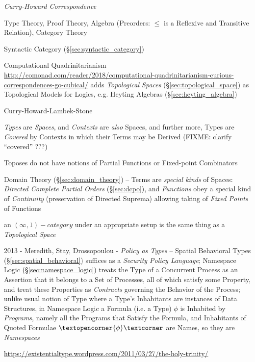 \emph{Curry-Howard Correspondence}

Type Theory, Proof Theory, Algebra (Preorders: $\leq$ is a Reflexive
and Transitive Relation), Category Theory

Syntactic Category (\S\ref{sec:syntactic_category}) %

Computational Quadrinitarianism
\url{http://comonad.com/reader/2018/computational-quadrinitarianism-curious-correspondences-go-cubical/}
adds \emph{Topological Spaces} (\S\ref{sec:topological_space}) as Topological
Models for Logics, e.g. Heyting Algebras (\S\ref{sec:heyting_algebra})

Curry-Howard-Lambek-Stone

\emph{Types} are \emph{Spaces}, and \emph{Contexts} are \emph{also} Spaces, and
further more, Types are \emph{Covered} by Contexts in which their Terms may be
Derived (FIXME: clarify ``covered'' ???)

Toposes do not have notions of Partial Functions or Fixed-point
Combinators

Domain Theory (\S\ref{sec:domain_theory}) -- Terms are \emph{special kinds} of
Spaces: \emph{Directed Complete Partial Orders} (\S\ref{sec:dcpo}), and
\emph{Functions} obey a special kind of \emph{Continuity} (preservation of
Directed Suprema) allowing taking of \emph{Fixed Points} of Functions

an $(\infty,1)-category$ under an appropriate setup is the same thing as a
\emph{Topological Space}

2013 - Meredith, Stay, Drossopoulou - \emph{Policy as Types} -- Spatial
Behavioral Types (\S\ref{sec:spatial_behavioral}) suffices as a \emph{Security
  Policy Language}; Namespace Logic (\S\ref{sec:namespace_logic}) treats the
Type of a Concurrent Process as an Assertion that it belongs to a Set of
Processes, all of which satisfy some Property, and treat these Properties as
\emph{Contracts} governing the Behavior of the Process; unlike usual notion of
Type where a Type's Inhabitants are instances of Data Structures, in Namespace
Logic a Formula (i.e. a Type) $\phi$ is Inhabited by \emph{Programs}, namely all
the Programs that Satisfy the Formula, and Inhabitants of Quoted Formulae
$\textopencorner{\phi}\textcorner$ are Names, so they are \emph{Namespaces}

\asterism

\url{https://existentialtype.wordpress.com/2011/03/27/the-holy-trinity/}


